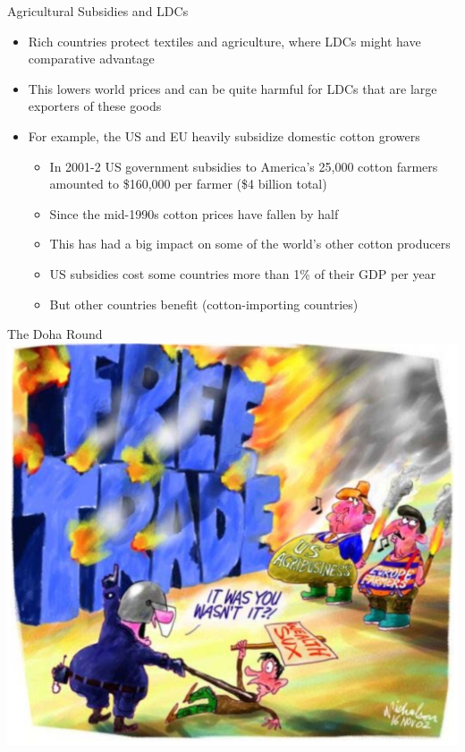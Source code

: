 \documentclass[10pt,hyperref={CJKbookmarks=true},xcolor=dvipsnames,aspectratio=169]{beamer}
\begin{document}
\begin{frame}{Agricultural Subsidies and LDCs}
\begin{itemize}
	\item 	Rich countries protect textiles and agriculture, where LDCs
	might have comparative advantage
	\item This lowers world prices and can be quite harmful for LDCs
	that are large exporters of these goods
	\item For example, the US and EU heavily subsidize domestic
	cotton growers
	\begin{itemize}
		\item In 2001-2 US government subsidies to America’s 25,000 cotton
		farmers amounted to \$160,000 per farmer (\$4 billion total)
		\item Since the mid-1990s cotton prices have fallen by half
		\item This has had a big impact on some of the world’s other cotton
		producers
		\item US subsidies cost some countries more than 1\% of their GDP per year
		\item But other countries benefit (cotton-importing countries)
	\end{itemize}
	
\end{itemize}
\end{frame}


\begin{frame}{The Doha Round}
\centering \includegraphics[scale=0.35]{fig/politic/doha2}
\end{frame}
\end{document}
